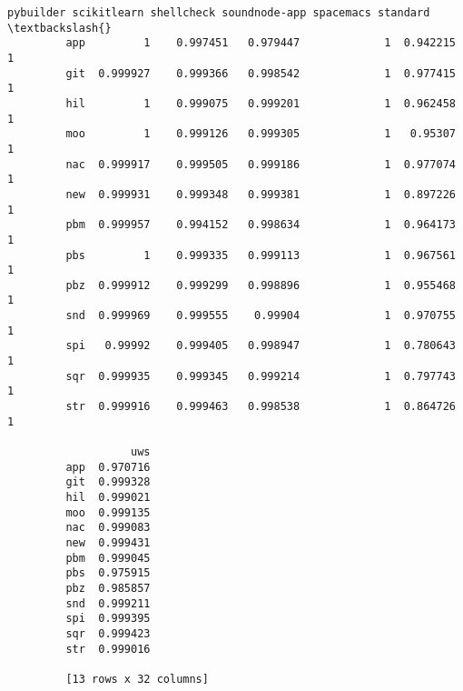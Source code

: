 \documentclass[11pt]{article}
\begin{document}
\begin{Verbatim}[commandchars=\\\{\}]
             pybuilder scikitlearn shellcheck soundnode-app spacemacs standard  \textbackslash{}
         app         1    0.997451   0.979447             1  0.942215        1   
         git  0.999927    0.999366   0.998542             1  0.977415        1   
         hil         1    0.999075   0.999201             1  0.962458        1   
         moo         1    0.999126   0.999305             1   0.95307        1   
         nac  0.999917    0.999505   0.999186             1  0.977074        1   
         new  0.999931    0.999348   0.999381             1  0.897226        1   
         pbm  0.999957    0.994152   0.998634             1  0.964173        1   
         pbs         1    0.999335   0.999113             1  0.967561        1   
         pbz  0.999912    0.999299   0.998896             1  0.955468        1   
         snd  0.999969    0.999555    0.99904             1  0.970755        1   
         spi   0.99992    0.999405   0.998947             1  0.780643        1   
         sqr  0.999935    0.999345   0.999214             1  0.797743        1   
         str  0.999916    0.999463   0.998538             1  0.864726        1   
         
                   uws  
         app  0.970716  
         git  0.999328  
         hil  0.999021  
         moo  0.999135  
         nac  0.999083  
         new  0.999431  
         pbm  0.999045  
         pbs  0.975915  
         pbz  0.985857  
         snd  0.999211  
         spi  0.999395  
         sqr  0.999423  
         str  0.999016  
         
         [13 rows x 32 columns]
\end{Verbatim}
            
\end{document}
